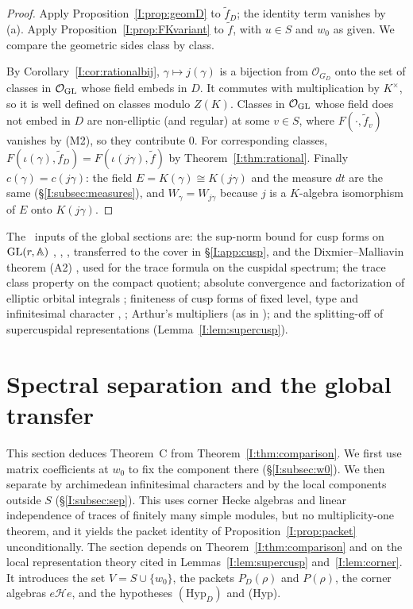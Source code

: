 \begin{proof}
Apply Proposition~\ref{I:prop:geomD} to $\tilde f_D$; the identity term vanishes by (a). Apply Proposition~\ref{I:prop:FKvariant} to $\tilde f$, with $u\in S$ and $w_0$ as given. We compare the geometric sides class by class.

By Corollary~\ref{I:cor:rationalbij}, $\gamma\mapsto j(\gamma)$ is a bijection from $\mathcal O_{G_D}$ onto the set of classes in $\mathcal O_{\mathrm{GL}}$ whose field embeds in $D$. It commutes with multiplication by $K^\times$, so it is well defined on classes modulo $Z(K)$. Classes in $\mathcal O_{\mathrm{GL}}$ whose field does not embed in $D$ are non-elliptic (and regular) at some $v\in S$, where $F(\cdot,\tilde f_v)$ vanishes by (M2), so they contribute $0$. For corresponding classes, $F(\iota(\gamma),\tilde f_D)=F(\iota(j\gamma),\tilde f)$ by Theorem~\ref{I:thm:rational}. Finally $c(\gamma)=c(j\gamma)$: the field $E=K(\gamma)\cong K(j\gamma)$ and the measure $dt$ are the same (\S\ref{I:subsec:measures}), and $W_\gamma=W_{j\gamma}$ because $j$ is a $K$-algebra isomorphism of $E$ onto $K(j\gamma)$.
\end{proof}

\begin{remark}\label{I:rem:Einputs}
The \Ev\ inputs of the global sections are: the sup-norm bound for cusp forms on $\mathrm{GL}(r,\mathbb{A})$ \cite{GGPS69}, \cite{God66}, \cite[I.2]{MW95}, transferred to the cover in \S\ref{I:app:cusp}, and the Dixmier--Malliavin theorem (A2) \cite{DM78}, used for the trace formula on the cuspidal spectrum; the trace class property on the compact quotient; absolute convergence and factorization of elliptic orbital integrals \cite[\S6]{FK86}; finiteness of cusp forms of fixed level, type and infinitesimal character \cite{HC68}, \cite[I.2]{MW95}; Arthur's multipliers \cite{Art83} (as in \cite[Lemma~6.3]{JC26a}); and the splitting-off of supercuspidal representations (Lemma~\ref{I:lem:supercusp}).
\end{remark}

\section{Spectral separation and the global transfer}\label{I:sec:spectral}
This section deduces Theorem~C from Theorem~\ref{I:thm:comparison}. We first use matrix coefficients at $w_0$ to fix the component there (\S\ref{I:subsec:w0}). We then separate by archimedean infinitesimal characters and by the local components outside $S$ (\S\ref{I:subsec:sep}). This uses corner Hecke algebras and linear independence of traces of finitely many simple modules, but no multiplicity-one theorem, and it yields the packet identity of Proposition~\ref{I:prop:packet} unconditionally. The section depends on Theorem~\ref{I:thm:comparison} and on the local representation theory cited in Lemmas~\ref{I:lem:supercusp} and~\ref{I:lem:corner}. It introduces the set $V=S\cup\{w_0\}$, the packets $P_D(\rho)$ and $P(\rho)$, the corner algebras $e\mathcal He$, and the hypotheses $(\mathrm{Hyp}_D)$ and (Hyp).

